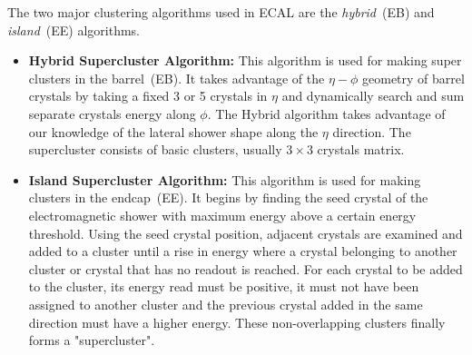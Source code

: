 The two major clustering algorithms used in ECAL are the \textit{hybrid}~(EB) and \textit{island}~(EE) algorithms.
\begin{itemize}
\item \textbf{Hybrid Supercluster Algorithm:} This algorithm is used for making super clusters in the barrel~(EB). It takes advantage of the $\eta - \phi$ geometry of barrel crystals by taking a fixed 3 or 5 crystals in $\eta$ and dynamically search and sum separate crystals energy along $\phi$. The Hybrid algorithm takes advantage of our knowledge of the lateral shower shape along the $\eta$ direction. The supercluster consists of basic clusters, usually $3\times3$ crystals matrix.

\item \textbf{Island Supercluster Algorithm:} This algorithm is used for making clusters in the endcap~(EE). It begins by finding the seed crystal of the electromagnetic shower with maximum energy above a certain energy threshold. Using the seed crystal position, adjacent crystals are examined %
and added to a cluster until a rise in energy where a crystal belonging to another cluster or crystal that has no readout is reached. For each crystal to be added to the cluster, its energy read must be positive, it must not have been assigned to another cluster and the previous crystal added in the same direction must have a higher energy. These non-overlapping clusters finally forms a "supercluster".
\end{itemize} 

